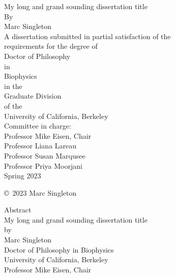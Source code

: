 \documentclass[11pt,letterpaper,oneside]{book}
\begin{document}
\begin{titlepage}
    \begin{center}
    My long and grand sounding dissertation title\\
    \bigskip
    By\\
    Marc Singleton\\
    \vfill
    A dissertation submitted in partial satisfaction of the\\
    requirements for the degree of\\
    Doctor of Philosophy\\
    in\\
    Biophysics\\
    in the\\
    Graduate Division\\
    of the\\
    University of California, Berkeley\\
    \vfill
    Committee in charge:\\
    Professor Mike Eisen, Chair\\
    Professor Liana Lareau\\
    Professor Susan Marqusee\\
    Professor Priya Moorjani\\
    \bigskip
    Spring 2023\\
    \end{center}
\end{titlepage}

\thispagestyle{empty}
\null  %
\vfill
\begin{center}
    \copyright \  2023 Marc Singleton
\end{center}
\clearpage

\setcounter{page}{1}  %
\begin{center}
    Abstract\\
    \bigskip
    My long and grand sounding dissertation title\\
    by\\
    Marc Singleton\\
    \bigskip
    Doctor of Philosophy in Biophysics\\
    University of California, Berkeley\\
    Professor Mike Eisen, Chair\\
    \bigskip
\end{center}
\lipsum[1-5]
\clearpage
\end{document}
